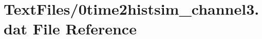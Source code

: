 \hypertarget{0time2histsim__channel3_8dat}{}\section{Text\+Files/0time2histsim\+\_\+channel3.dat File Reference}
\label{0time2histsim__channel3_8dat}
